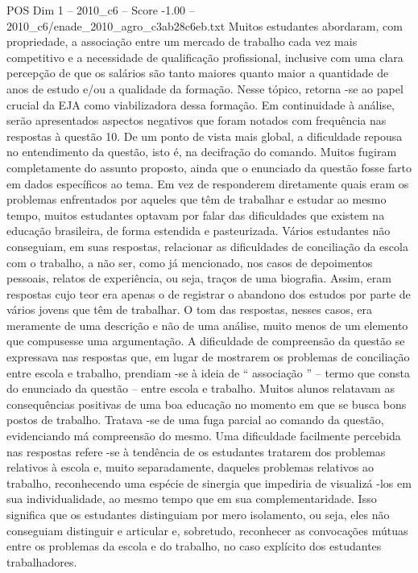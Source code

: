 \begin{textsample}{POS Dim 1 – 2010\_c6 – Score -1.00 – 2010\_c6/enade\_2010\_agro\_c3ab28c6eb.txt}
Muitos estudantes abordaram, com propriedade, a associação entre um mercado de trabalho cada vez mais competitivo e a necessidade de qualificação profissional, inclusive com uma clara percepção de que os salários são tanto maiores quanto maior a quantidade de anos de estudo e/ou a qualidade da formação.
Nesse tópico, retorna -se ao papel crucial da EJA como viabilizadora dessa formação.
Em continuidade à análise, serão apresentados aspectos negativos que foram notados com frequência nas respostas à questão 10.
De um ponto de vista mais global, a dificuldade repousa no entendimento da questão, isto é, na decifração do comando.
Muitos fugiram completamente do assunto proposto, ainda que o enunciado da questão fosse farto em dados específicos ao tema.
Em vez de responderem diretamente quais eram os problemas enfrentados por aqueles que têm de trabalhar e estudar ao mesmo tempo, muitos estudantes optavam por falar das dificuldades que existem na educação brasileira, de forma estendida e pasteurizada.
Vários estudantes não conseguiam, em suas respostas, relacionar as dificuldades de conciliação da escola com o trabalho, a não ser, como já mencionado, nos casos de depoimentos pessoais, relatos de experiência, ou seja, traços de uma biografia.
Assim, eram respostas cujo teor era apenas o de registrar o abandono dos estudos por parte de vários jovens que têm de trabalhar.
O tom das respostas, nesses casos, era meramente de uma descrição e não de uma análise, muito menos de um elemento que compusesse uma argumentação.
A dificuldade de compreensão da questão se expressava nas respostas que, em lugar de mostrarem os problemas de conciliação entre escola e trabalho, prendiam -se à ideia de “ associação ” – termo que consta do enunciado da questão – entre escola e trabalho.
Muitos alunos relatavam as consequências positivas de uma boa educação no momento em que se busca bons postos de trabalho.
Tratava -se de uma fuga parcial ao comando da questão, evidenciando má compreensão do mesmo.
Uma dificuldade facilmente percebida nas respostas refere -se à tendência de os estudantes tratarem dos problemas relativos à escola e, muito separadamente, daqueles problemas relativos ao trabalho, reconhecendo uma espécie de sinergia que impediria de visualizá -los em sua individualidade, ao mesmo tempo que em sua complementaridade.
Isso significa que os estudantes distinguiam por mero isolamento, ou seja, eles não conseguiam distinguir e articular e, sobretudo, reconhecer as convocações mútuas entre os problemas da escola e do trabalho, no caso explícito dos estudantes trabalhadores.

\end{textsample}
